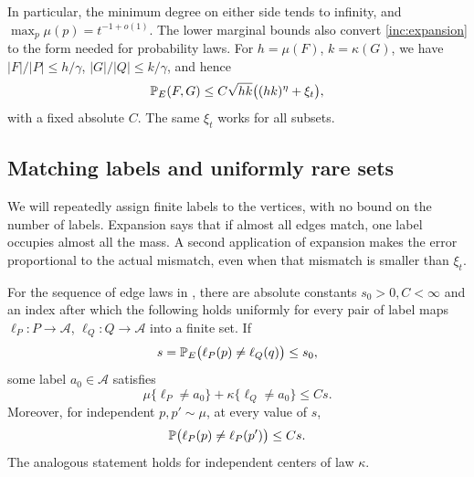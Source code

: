 In particular, the minimum degree on either side tends to infinity,
and \(\max_p\mu(p)=t^{-1+o(1)}\). The lower marginal bounds also
convert \eqref{inc:expansion} to the form needed for probability laws.
For \(h=\mu(F)\), \(k=\kappa(G)\), we have
\(|F|/|P|\le h/\gamma\), \(|G|/|Q|\le k/\gamma\), and hence
\begin{equation}\label{inc:marginal-expansion}
 \mathbb P_E(F,G)\le C\sqrt{hk}\bigl((hk)^\eta+\xi_t\bigr),
\end{equation}
with a fixed absolute \(C\). The same \(\xi_t\) works for all subsets.

\subsection{Matching labels and uniformly rare sets}

We will repeatedly assign finite labels to the vertices, with no bound
on the number of labels. Expansion says that if almost all edges match,
one label occupies almost all the mass. A second application of
expansion makes the error proportional to the actual mismatch, even
when that mismatch is smaller than \(\xi_t\).

\begin{lemma}\label{inc:matching}
For the sequence of edge laws in , there are absolute
constants \(s_0>0,C<\infty\) and an index after which the following
holds uniformly for every pair of label maps
\(\ell_P:P\to\mathcal A\), \(\ell_Q:Q\to\mathcal A\) into a
finite set. If
\[
 s=\mathbb P_E\bigl(\ell_P(p)\ne\ell_Q(q)\bigr)\le s_0,
\]
some label \(a_0\in\mathcal A\) satisfies
\[
 \mu\{\ell_P\ne a_0\}+\kappa\{\ell_Q\ne a_0\}\le Cs.
\]
Moreover, for independent \(p,p'\sim\mu\), at every value of \(s\),
\begin{equation}\label{inc:point-label-mismatch}
 \mathbb P\bigl(\ell_P(p)\ne\ell_P(p')\bigr)\le Cs.
\end{equation}
The analogous statement holds for independent centers of law \(\kappa\).
\end{lemma}

